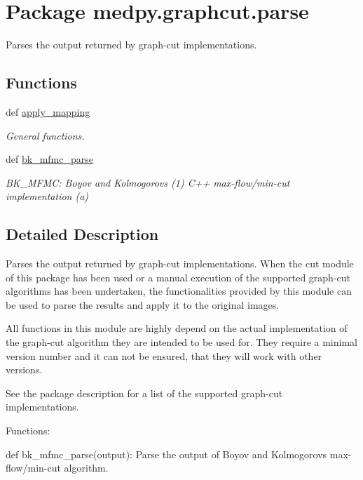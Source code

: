 \hypertarget{namespacemedpy_1_1graphcut_1_1parse}{
\section{Package medpy.graphcut.parse}
\label{namespacemedpy_1_1graphcut_1_1parse}
}


Parses the output returned by graph-\/cut implementations.  


\subsection*{Functions}
\begin{DoxyCompactItemize}
\item 
def \hyperlink{namespacemedpy_1_1graphcut_1_1parse_a4b0fa7d0b34e0d4535b5d886ae50c15c}{apply\_\-mapping}
\begin{DoxyCompactList}\small\item\em General functions. \end{DoxyCompactList}\item 
def \hyperlink{namespacemedpy_1_1graphcut_1_1parse_a854e8b0de2b223ed0c23de9f5858ef5e}{bk\_\-mfmc\_\-parse}
\begin{DoxyCompactList}\small\item\em BK\_\-MFMC: Boyov and Kolmogorovs (1) C++ max-\/flow/min-\/cut implementation (a) \end{DoxyCompactList}\end{DoxyCompactItemize}


\subsection{Detailed Description}
Parses the output returned by graph-\/cut implementations. When the cut module of this package has been used or a manual execution of the supported graph-\/cut algorithms has been undertaken, the functionalities provided by this module can be used to parse the results and apply it to the original images.

All functions in this module are highly depend on the actual implementation of the graph-\/cut algorithm they are intended to be used for. They require a minimal version number and it can not be ensured, that they will work with other versions.

See the package description for a list of the supported graph-\/cut implementations.

Functions:
\begin{DoxyItemize}
\item def bk\_\-mfmc\_\-parse(output): Parse the output of Boyov and Kolmogorovs max-\/flow/min-\/cut algorithm.
\end{DoxyItemize}

